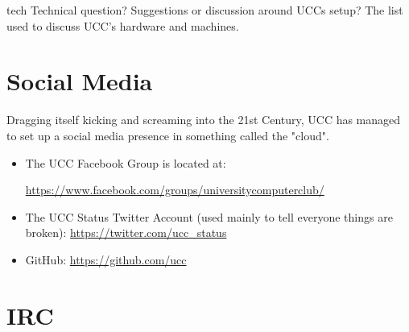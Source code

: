 \begin{ucclist}{tech}
Technical question? Suggestions or discussion around UCCs setup? 
The list used to discuss UCC's hardware and machines. 
\end{ucclist}

\pagebreak

\section{Social Media}

\begin{mdframed}[nobreak=true]
\null
Dragging itself kicking and screaming into the 21st Century, UCC has managed to set up a social media presence in something called the "cloud".

\begin{itemize}
\item The UCC Facebook Group is located at: 

\url{https://www.facebook.com/groups/universitycomputerclub/}
\item The UCC Status Twitter Account (used mainly to tell everyone things are broken): \url{https://twitter.com/ucc_status}
\item GitHub: \url{https://github.com/ucc}

\end{itemize}

\pagebreak



\end{mdframed}

\section{IRC}


